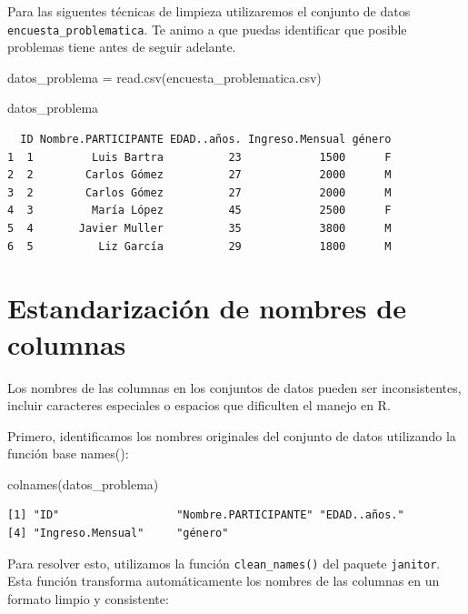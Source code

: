 \documentclass[
  letterpaper,
  DIV=11,
  numbers=noendperiod,
  twoside]{scrreprt}
\newenvironment{Shaded}{\begin{snugshade}}{\end{snugshade}}
\newcommand{\FunctionTok}[1]{\textcolor[rgb]{0.28,0.35,0.67}{#1}}
\newcommand{\NormalTok}[1]{\textcolor[rgb]{0.00,0.23,0.31}{#1}}
\newcommand{\OtherTok}[1]{\textcolor[rgb]{0.00,0.23,0.31}{#1}}
\newcommand{\StringTok}[1]{\textcolor[rgb]{0.13,0.47,0.30}{#1}}
\begin{document}
Para las siguentes técnicas de limpieza utilizaremos el conjunto de
datos \texttt{encuesta\_problematica}. Te animo a que puedas identificar
que posible problemas tiene antes de seguir adelante.

\begin{Shaded}
\begin{Highlighting}[]
\NormalTok{datos\_problema }\OtherTok{=} \FunctionTok{read.csv}\NormalTok{(}\StringTok{\textquotesingle{}encuesta\_problematica.csv\textquotesingle{}}\NormalTok{)}

\NormalTok{datos\_problema}
\end{Highlighting}
\end{Shaded}

\begin{verbatim}
  ID Nombre.PARTICIPANTE EDAD..años. Ingreso.Mensual género
1  1         Luis Bartra          23            1500      F
2  2        Carlos Gómez          27            2000      M
3  2        Carlos Gómez          27            2000      M
4  3         María López          45            2500      F
5  4       Javier Muller          35            3800      M
6  5          Liz García          29            1800      M
\end{verbatim}

\section{Estandarización de nombres de
columnas}\label{estandarizaciuxf3n-de-nombres-de-columnas}

Los nombres de las columnas en los conjuntos de datos pueden ser
inconsistentes, incluir caracteres especiales o espacios que dificulten
el manejo en R.

Primero, identificamos los nombres originales del conjunto de datos
utilizando la función base names():

\begin{Shaded}
\begin{Highlighting}[]
\FunctionTok{colnames}\NormalTok{(datos\_problema)}
\end{Highlighting}
\end{Shaded}

\begin{verbatim}
[1] "ID"                  "Nombre.PARTICIPANTE" "EDAD..años."        
[4] "Ingreso.Mensual"     "género"             
\end{verbatim}

Para resolver esto, utilizamos la función \texttt{clean\_names()} del
paquete \texttt{janitor}. Esta función transforma automáticamente los
nombres de las columnas en un formato limpio y consistente:
\end{document}
